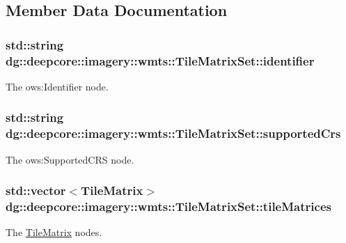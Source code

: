 \subsection{Member Data Documentation}
\subsubsection[{\texorpdfstring{identifier}{identifier}}]{\setlength{\rightskip}{0pt plus 5cm}std\+::string dg\+::deepcore\+::imagery\+::wmts\+::\+Tile\+Matrix\+Set\+::identifier}\hypertarget{structdg_1_1deepcore_1_1imagery_1_1wmts_1_1_tile_matrix_set_a2b6b1065b7596abbadab0ae4889c3e5c}{}\label{structdg_1_1deepcore_1_1imagery_1_1wmts_1_1_tile_matrix_set_a2b6b1065b7596abbadab0ae4889c3e5c}


The ows\+:Identifier node. 

\subsubsection[{\texorpdfstring{supported\+Crs}{supportedCrs}}]{\setlength{\rightskip}{0pt plus 5cm}std\+::string dg\+::deepcore\+::imagery\+::wmts\+::\+Tile\+Matrix\+Set\+::supported\+Crs}\hypertarget{structdg_1_1deepcore_1_1imagery_1_1wmts_1_1_tile_matrix_set_a1105d518a115fa42e1bf1d9e1eaf41f0}{}\label{structdg_1_1deepcore_1_1imagery_1_1wmts_1_1_tile_matrix_set_a1105d518a115fa42e1bf1d9e1eaf41f0}


The ows\+:Supported\+C\+RS node. 

\subsubsection[{\texorpdfstring{tile\+Matrices}{tileMatrices}}]{\setlength{\rightskip}{0pt plus 5cm}std\+::vector$<${\bf Tile\+Matrix}$>$ dg\+::deepcore\+::imagery\+::wmts\+::\+Tile\+Matrix\+Set\+::tile\+Matrices}\hypertarget{structdg_1_1deepcore_1_1imagery_1_1wmts_1_1_tile_matrix_set_a7359847b6ccb8bb86a41640e43e15876}{}\label{structdg_1_1deepcore_1_1imagery_1_1wmts_1_1_tile_matrix_set_a7359847b6ccb8bb86a41640e43e15876}


The \hyperlink{structdg_1_1deepcore_1_1imagery_1_1wmts_1_1_tile_matrix}{Tile\+Matrix} nodes. 

